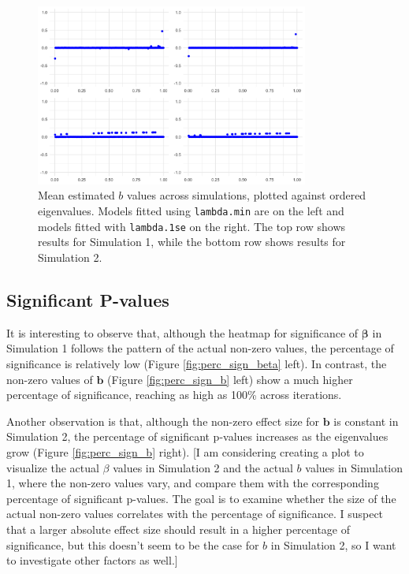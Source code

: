 \documentclass[12pt]{article}
\begin{document}
\begin{figure}[h!]
	\centering
	\includegraphics[width=0.8\textwidth]{b_estimates.png}
	\caption{Mean estimated \( b \) values across simulations, plotted against ordered eigenvalues. Models fitted using
		\texttt{lambda.min} are on the left and models fitted with \texttt{lambda.1se} on the right. The top row shows results for Simulation 1, while the bottom row shows results for Simulation 2.}
	\label{fig:b_estimates}
\end{figure}

\FloatBarrier

\subsection*{Significant P-values}

It is interesting to observe that, although the heatmap for significance of \( \boldsymbol{\beta} \) in Simulation 1 follows the pattern of the actual non-zero values, the percentage of significance is relatively low (Figure \ref{fig:perc_sign_beta} left). In contrast, the non-zero values of \( \mathbf{b} \) (Figure \ref{fig:perc_sign_b} left) show a much higher percentage of significance, reaching as high as 100\% across iterations.

Another observation is that, although the non-zero effect size for \( \mathbf{b} \) is constant in Simulation 2, the percentage of significant p-values increases as the eigenvalues grow (Figure \ref{fig:perc_sign_b} right). [I am considering creating a plot to visualize the actual \( \beta \) values in Simulation 2 and the actual \( b \) values in Simulation 1, where the non-zero values vary, and compare them with the corresponding percentage of significant p-values. The goal is to examine whether the size of the actual non-zero values correlates with the percentage of significance. I suspect that a larger absolute effect size should result in a higher percentage of significance, but this doesn’t seem to be the case for \( b \) in Simulation 2, so I want to investigate other factors as well.]
\end{document}
